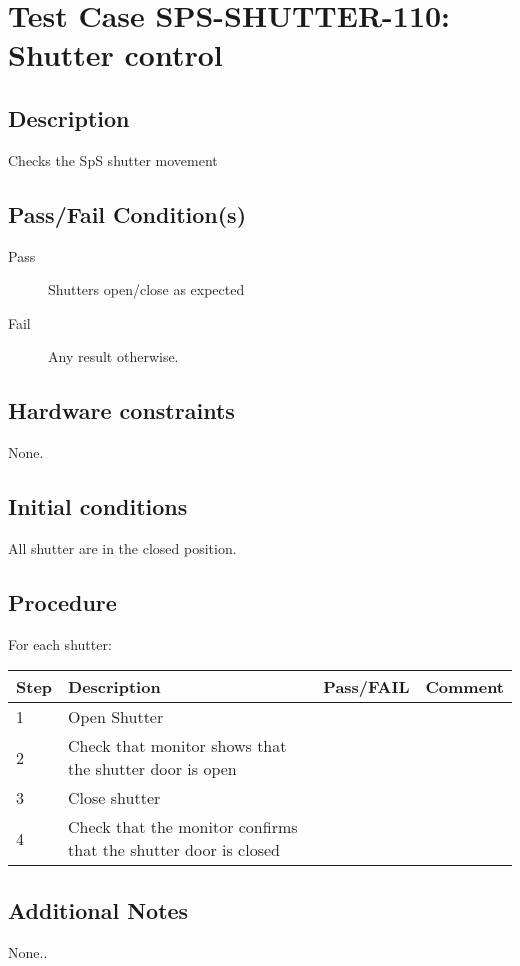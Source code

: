 \section{Test Case SPS-SHUTTER-110: Shutter control}

\subsection{Description}

Checks the SpS shutter movement

\subsection{Pass/Fail Condition(s)}

\begin{description}
\item [Pass] Shutters open/close as expected
\item [Fail] Any result otherwise. 
\end{description}

\subsection{Hardware constraints}

None.

\subsection{Initial conditions}

All shutter are in the closed position.

\subsection{Procedure}

For each shutter:

\begin{table}[H]
    \begin{tabular}{|l| p{5cm} |l| p{5cm} |}
    \hline
    {\bf Step} & {\bf Description} & {\bf Pass/FAIL} & {\bf Comment}  \\ \hline
    1 & Open Shutter &  &  \\ \hline
    2 & Check that monitor shows that the shutter door is open &  &  \\ \hline
    3 & Close shutter &  &  \\ \hline
    4 & Check that the monitor confirms that the shutter door is closed &  &  \\ \hline
    \end{tabular}
\end{table}


\subsection{Additional Notes}

None..
